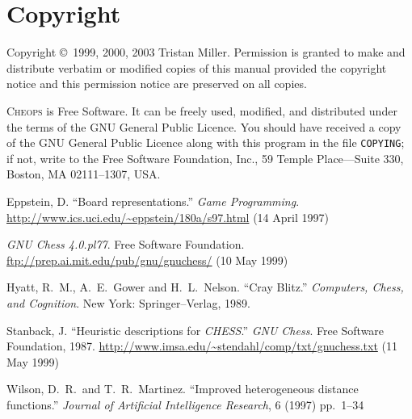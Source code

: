 \documentclass[a4paper]{article}
\begin{document}
\section{Copyright}

Copyright \copyright\ 1999, 2000, 2003 Tristan Miller.  Permission is
granted to make and distribute verbatim or modified copies of this
manual provided the copyright notice and this permission notice are
preserved on all copies.

\textsc{Cheops} is Free Software. It can be freely used, modified, and
distributed under the terms of the GNU General Public Licence.  You
should have received a copy of the GNU General Public Licence along
with this program in the file \texttt{COPYING}; if not, write to the
Free Software Foundation, Inc., 59 Temple Place---Suite 330, Boston,
MA 02111--1307, USA.

\begin{thebibliography}{99}

 Eppstein, D. ``Board representations.''
  \emph{Game Programming}.
  \url{http://www.ics.uci.edu/~eppstein/180a/s97.html}  (14 April 1997)

 \emph{GNU Chess 4.0.pl77}.  Free Software
  Foundation.  \url{ftp://prep.ai.mit.edu/pub/gnu/gnuchess/} (10 May 1999)

 Hyatt, R.~M., A.~E.~Gower and H.~L.~Nelson.
  ``Cray Blitz.'' \emph{Computers, Chess, and Cognition}.  New York:
  Springer--Verlag, 1989.

 Stanback, J.  ``Heuristic descriptions for
  \emph{CHESS}.''  \emph{GNU Chess}.  Free Software Foundation, 1987.
  \url{http://www.imsa.edu/~stendahl/comp/txt/gnuchess.txt} (11 May 1999)

 Wilson, D.~R.~and T.~R.~Martinez. ``Improved
  heterogeneous distance functions.''  \emph{Journal of Artificial
    Intelligence Research}, 6 (1997) pp.~1--34

\end{thebibliography}
\end{document}
